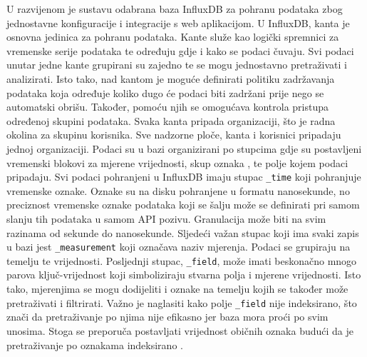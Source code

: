 U razvijenom je sustavu odabrana baza InfluxDB za pohranu podataka zbog jednostavne konfiguracije i integracije s web aplikacijom. U InfluxDB, kanta  je osnovna jedinica za pohranu podataka. Kante služe kao logički spremnici za vremenske serije podataka te određuju gdje i kako se podaci čuvaju. Svi podaci unutar jedne kante grupirani su zajedno te se mogu jednostavno pretraživati i analizirati. Isto tako, nad kantom je moguće definirati politiku zadržavanja podataka  koja određuje koliko dugo će podaci biti zadržani prije nego se automatski obrišu. Također, pomoću njih se omogućava kontrola pristupa određenoj skupini podataka. Svaka kanta pripada organizaciji, što je radna okolina za skupinu korisnika. Sve nadzorne ploče, kanta i korisnici pripadaju jednoj organizaciji. Podaci su u bazi organizirani po stupcima gdje su postavljeni vremenski blokovi za mjerene vrijednosti, skup oznaka , te polje kojem podaci pripadaju. Svi podaci pohranjeni u InfluxDB imaju stupac \lstinline|_time| koji pohranjuje vremenske oznake. Oznake su na disku pohranjene u formatu nanosekunde, no preciznost vremenske oznake podataka koji se šalju može se definirati pri samom slanju tih podataka u samom API pozivu. Granulacija može biti na svim razinama od sekunde do nanosekunde. Sljedeći važan stupac koji ima svaki zapis u bazi jest \lstinline|_measurement| koji označava naziv mjerenja. Podaci se grupiraju na temelju te vrijednosti. Posljednji stupac, \lstinline|_field|, može imati beskonačno mnogo parova ključ-vrijednost koji simboliziraju stvarna polja i mjerene vrijednosti. Isto tako, mjerenjima se mogu dodijeliti i oznake na temelju kojih se također može pretraživati i filtrirati. Važno je naglasiti kako polje \lstinline|_field| nije indeksirano, što znači da pretraživanje po njima nije efikasno jer baza mora proći po svim unosima. Stoga se preporuča postavljati vrijednost običnih oznaka budući da je pretraživanje po oznakama indeksirano \cite{influxdb}. 

